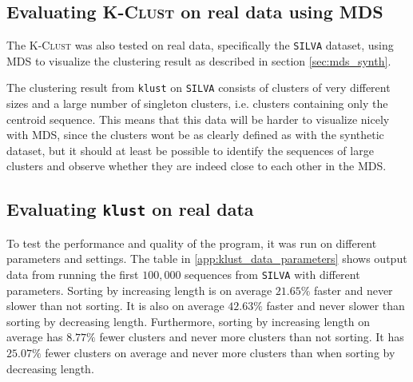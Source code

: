 

\subsection{Evaluating \textsc{K-Clust} on real data using MDS}

The \textsc{K-Clust} was also tested on real data, specifically the
\texttt{SILVA} dataset, using MDS to visualize the clustering result as
described in section \ref{sec:mds_synth}.

The clustering result from \texttt{klust} on \texttt{SILVA} consists of
clusters of very different sizes and a large number of singleton clusters, i.e.
clusters containing only the centroid sequence. This means that this data will
be harder to visualize nicely with MDS, since the clusters wont be as clearly
defined as with the synthetic dataset, but it should at least be possible to
identify the sequences of large clusters and observe whether they are indeed
close to each other in the MDS.


\subsection{Evaluating \texttt{klust} on real data}



To test the performance and quality of the program, it was run on different
parameters and settings. The table in \ref{app:klust_data_parameters} shows
output data from running the first $100,000$ sequences from \texttt{SILVA}
with different parameters. Sorting by increasing length is on average
$21.65\%$ faster and never slower than not sorting. It is also on average
$42.63\%$ faster and never slower than sorting by decreasing length.
Furthermore, sorting by increasing length on average has $8.77\%$ fewer
clusters and never more clusters than not sorting. It has $25.07\%$ fewer
clusters on average and never more clusters than when sorting by decreasing
length.

